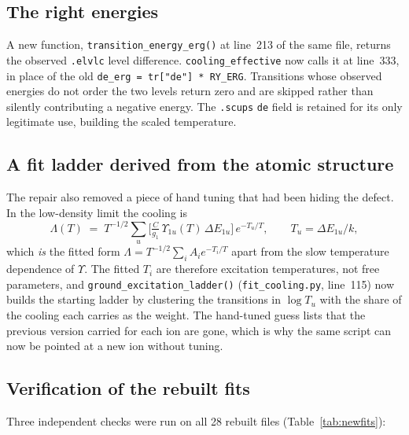 \documentclass[english,a4paper]{my_memo}
\newcommand{\code}[1]{\texttt{#1}}
\begin{document}
\subsection{The right energies}

A new function, \code{transition\_energy\_erg()} at line~213 of the same file,
returns the observed \code{.elvlc} level difference.
\code{cooling\_effective} now calls it at line~333, in place of the old
\code{de\_erg = tr["de"] * RY\_ERG}.  Transitions whose observed
energies do not order the two levels return zero and are skipped rather than
silently contributing a negative energy.  The \code{.scups} \code{de} field is
retained for its only legitimate use, building the scaled temperature.

\subsection{A fit ladder derived from the atomic structure}

The repair also removed a piece of hand tuning that had been hiding the
defect.  In the low-density limit the cooling is
\[
  \Lambda(T) \;=\; T^{-1/2}\sum_u
      \Big[\tfrac{C}{g_1}\,\Upsilon_{1u}(T)\,\Delta E_{1u}\Big]\,
      e^{-T_u/T}, \qquad T_u = \Delta E_{1u}/k,
\]
which \emph{is} the fitted form $\Lambda = T^{-1/2}\sum_i A_i e^{-T_i/T}$
apart from the slow temperature dependence of $\Upsilon$.  The fitted $T_i$
are therefore excitation temperatures, not free parameters, and
\code{ground\_excitation\_ladder()} (\code{fit\_cooling.py}, line~115) now
builds the starting ladder by clustering the transitions in $\log T_u$ with
the share of the cooling each carries as the weight.  The hand-tuned guess
lists that the previous version carried for each ion are gone, which is why
the same script can now be pointed at a new ion without tuning.

\subsection{Verification of the rebuilt fits}
\label{sec:fitver}

Three independent checks were run on all 28 rebuilt files
(Table~\ref{tab:newfits}):
\end{document}
